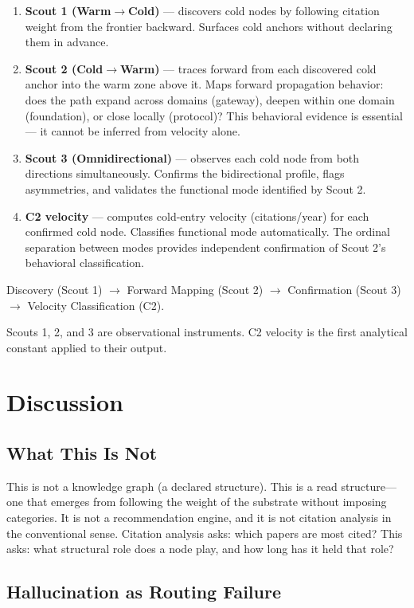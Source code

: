 \documentclass[11pt]{article}
\begin{document}
\begin{enumerate}
\item \textbf{Scout 1 (Warm$\to$Cold)} --- discovers cold nodes by following citation weight from the frontier backward. Surfaces cold anchors without declaring them in advance.
\item \textbf{Scout 2 (Cold$\to$Warm)} --- traces forward from each discovered cold anchor into the warm zone above it. Maps forward propagation behavior: does the path expand across domains (gateway), deepen within one domain (foundation), or close locally (protocol)? This behavioral evidence is essential --- it cannot be inferred from velocity alone.
\item \textbf{Scout 3 (Omnidirectional)} --- observes each cold node from both directions simultaneously. Confirms the bidirectional profile, flags asymmetries, and validates the functional mode identified by Scout 2.
\item \textbf{C2 velocity} --- computes cold-entry velocity (citations/year) for each confirmed cold node. Classifies functional mode automatically. The ordinal separation between modes provides independent confirmation of Scout 2's behavioral classification.
\end{enumerate}

Discovery (Scout 1) $\to$ Forward Mapping (Scout 2) $\to$ Confirmation (Scout 3) $\to$ Velocity Classification (C2).

Scouts 1, 2, and 3 are observational instruments. C2 velocity is the first analytical constant applied to their output.

\section{Discussion}

\subsection{What This Is Not}

This is not a knowledge graph (a declared structure). This is a read structure---one that emerges from following the weight of the substrate without imposing categories. It is not a recommendation engine, and it is not citation analysis in the conventional sense. Citation analysis asks: which papers are most cited? This asks: what structural role does a node play, and how long has it held that role?

\subsection{Hallucination as Routing Failure}
\end{document}
